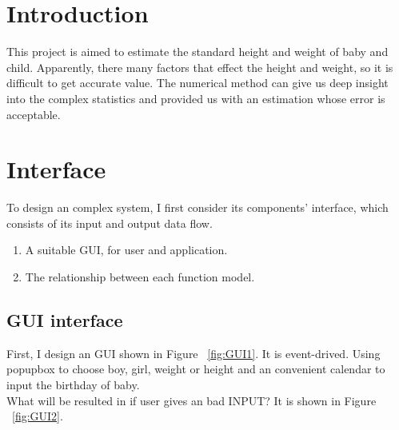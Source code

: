\documentclass[
10pt, %
a4paper, %
oneside, %
headinclude,footinclude, %
BCOR5mm, %
]{scrartcl}
\begin{document}
{\let\thefootnote\relax{}}



\newpage %


\section{Introduction}

This project is aimed to estimate the standard height and weight of baby and child. Apparently, there many factors that effect the height and weight, so it is difficult to get accurate value. The numerical method can give us deep insight into the complex statistics and provided us with an estimation whose error is acceptable.


\section{Interface}
To design an complex system, I first consider its components' interface, which consists of its input and output data flow.
\begin{enumerate}[noitemsep] %
\item A suitable GUI, for user and application.
\item The relationship between each function model.
\end{enumerate}


\subsection{GUI interface}
First, I design an GUI shown in Figure ~\vref{fig:GUI1}. It is event-drived. Using popupbox to choose boy, girl, weight or height and an convenient calendar to input the birthday of baby.
\\What will be resulted in if user gives an bad INPUT? It is shown in Figure ~\vref{fig:GUI2}.
\end{document}
